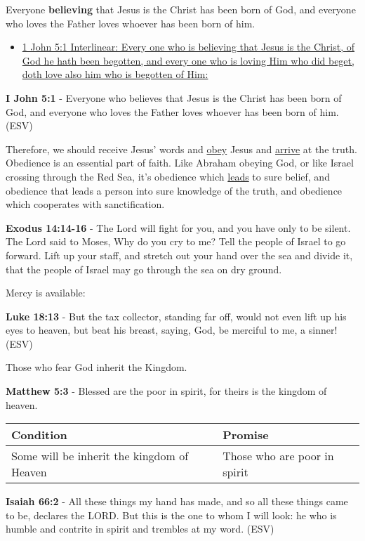 \documentclass[11pt]{article}
\begin{document}
Everyone \textbf{believing} that Jesus is the Christ has been born of God, and everyone who loves the Father loves whoever has been born of him.

\begin{itemize}
\item \href{https://biblehub.com/interlinear/1\_john/5-1.htm}{1 John 5:1 Interlinear: Every one who is believing that Jesus is the Christ, of God he hath been begotten, and every one who is loving Him who did beget, doth love also him who is begotten of Him:}
\end{itemize}

\textbf{I John 5:1} - Everyone who believes that Jesus is the Christ has been born of God, and everyone who loves the Father loves whoever has been born of him. (ESV)

Therefore, we should receive Jesus' words and \uline{obey} Jesus and \uline{arrive} at the truth. Obedience is an essential part of faith. Like Abraham obeying God, or like Israel crossing through the Red Sea, it's obedience which \uline{leads} to sure belief, and obedience that leads a person into sure knowledge of the truth, and obedience which cooperates with sanctification.

\textbf{Exodus 14:14-16} - The Lord will fight for you, and you have only to be silent.  The Lord said to Moses, Why do you cry to me? Tell the people of Israel to go forward.  Lift up your staff, and stretch out your hand over the sea and divide it, that the people of Israel may go through the sea on dry ground.

Mercy is available:

\textbf{Luke 18:13} - But the tax collector, standing far off, would not even lift up his eyes to heaven, but beat his breast, saying, God, be merciful to me, a sinner! (ESV)

Those who fear God inherit the Kingdom.

\textbf{Matthew 5:3} - Blessed are the poor in spirit, for theirs is the kingdom of heaven.

\begin{center}
\begin{tabular}{ll}
Condition & Promise\\[0pt]
\hline
Some will be inherit the kingdom of Heaven & Those who are poor in spirit\\[0pt]
\end{tabular}
\end{center}

\textbf{Isaiah 66:2} - All these things my hand has made, and so all these things came to be, declares the LORD. But this is the one to whom I will look: he who is humble and contrite in spirit and trembles at my word. (ESV)
\end{document}
